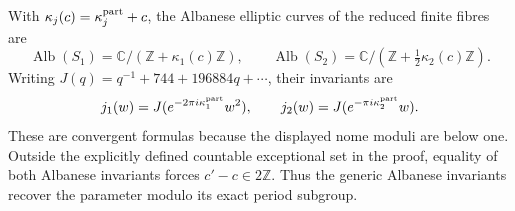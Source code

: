 \begin{proposition}\hypertarget{tag-01Q3}{}\label{fam:src:A.4.1}\label{fam:st:A.4.1}

With $\kappa_j(c)=\kappa_j^{\rm part}+c$, the Albanese elliptic curves of the reduced finite fibres are
\[
 \operatorname{Alb}(S_1)=\mathbb C/(\mathbb Z+\kappa_1(c)\mathbb Z),\qquad
 \operatorname{Alb}(S_2)=\mathbb C/(\mathbb Z+\tfrac12\kappa_2(c)\mathbb Z).
\]
Writing $J(q)=q^{-1}+744+196884q+\cdots$, their invariants are
\[
 j_1(w)=J(e^{-2\pi i\kappa_1^{\rm part}}w^2),\qquad
 j_2(w)=J(e^{-\pi i\kappa_2^{\rm part}}w).
\]
These are convergent formulas because the displayed nome moduli are below one. Outside the explicitly defined countable exceptional set in the proof, equality of both Albanese invariants forces $c'-c\in2\mathbb Z$. Thus the generic Albanese invariants recover the parameter modulo its exact period subgroup.
\end{proposition}


